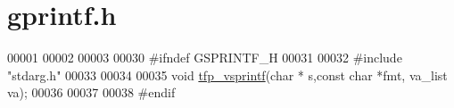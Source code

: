 \hypertarget{a00044_source}{\section{gprintf.\+h}
\label{a00044_source}
}

\begin{DoxyCode}
00001 
00002 
00003 
00030 \textcolor{preprocessor}{#ifndef GSPRINTF\_H}
00031 
00032 \textcolor{preprocessor}{#include "stdarg.h"}
00033 
00034 
00035 \textcolor{keywordtype}{void} \hyperlink{a00044_aa8dfc5ac91747032198002a008a6aa46}{tfp\_vsprintf}(\textcolor{keywordtype}{char} * s,\textcolor{keyword}{const} \textcolor{keywordtype}{char}  *fmt, va\_list va);
00036 
00037 
00038 \textcolor{preprocessor}{#endif}
\end{DoxyCode}
